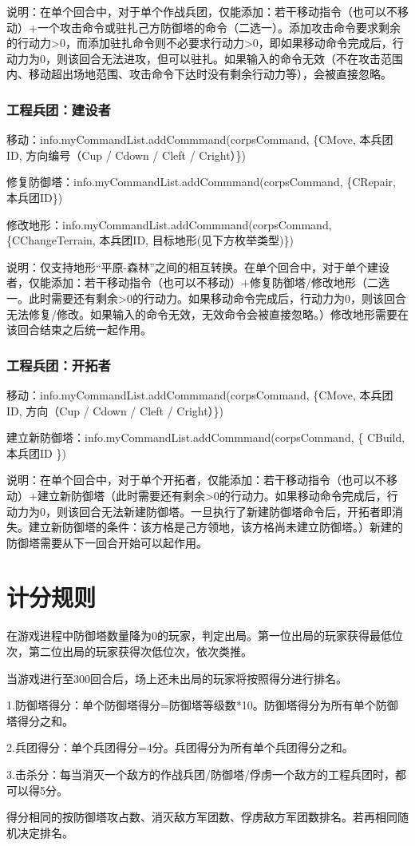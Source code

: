 \documentclass[a4paper,4pt]{article}
\begin{document}
说明：在单个回合中，对于单个作战兵团，仅能添加：若干移动指令（也可以不移动）+一个攻击命令或驻扎己方防御塔的命令（二选一）。添加攻击命令要求剩余的行动力>0，而添加驻扎命令则不必要求行动力>0，即如果移动命令完成后，行动力为0，则该回合无法进攻，但可以驻扎。如果输入的命令无效（不在攻击范围内、移动超出场地范围、攻击命令下达时没有剩余行动力等），会被直接忽略。

\subsubsection{工程兵团：建设者}
移动：info.myCommandList.addCommmand(corpsCommand, \{CMove, 本兵团ID, 方向编号（Cup / Cdown / Cleft / Cright）\})\par
修复防御塔：info.myCommandList.addCommmand(corpsCommand, \{CRepair, 本兵团ID\})\par
修改地形：info.myCommandList.addCommmand(corpsCommand, \{CChangeTerrain, 本兵团ID, 目标地形(见下方枚举类型)\})\par
说明：仅支持地形“平原-森林”之间的相互转换。在单个回合中，对于单个建设者，仅能添加：若干移动指令（也可以不移动）+修复防御塔/修改地形（二选一。此时需要还有剩余>0的行动力。如果移动命令完成后，行动力为0，则该回合无法修复/修改。如果输入的命令无效，无效命令会被直接忽略。）修改地形需要在该回合结束之后统一起作用。
\subsubsection{工程兵团：开拓者}
移动：info.myCommandList.addCommmand(corpsCommand, \{CMove, 本兵团ID, 方向（Cup / Cdown / Cleft / Cright）\})\par
建立新防御塔：info.myCommandList.addCommmand(corpsCommand, \{ CBuild, 本兵团ID \})\par
说明：在单个回合中，对于单个开拓者，仅能添加：若干移动指令（也可以不移动）+建立新防御塔（此时需要还有剩余>0的行动力。如果移动命令完成后，行动力为0，则该回合无法新建防御塔。一旦执行了新建防御塔命令后，开拓者即消失。建立新防御塔的条件：该方格是己方领地，该方格尚未建立防御塔。）新建的防御塔需要从下一回合开始可以起作用。

\section{计分规则}
在游戏进程中防御塔数量降为0的玩家，判定出局。第一位出局的玩家获得最低位次，第二位出局的玩家获得次低位次，依次类推。\par
当游戏进行至300回合后，场上还未出局的玩家将按照得分进行排名。\par
1.防御塔得分：单个防御塔得分=防御塔等级数*10。防御塔得分为所有单个防御塔得分之和。\par
2.兵团得分：单个兵团得分=4分。兵团得分为所有单个兵团得分之和。\par
3.击杀分：每当消灭一个敌方的作战兵团/防御塔/俘虏一个敌方的工程兵团时，都可以得5分。\par
得分相同的按防御塔攻占数、消灭敌方军团数、俘虏敌方军团数排名。若再相同随机决定排名。\par
\end{document}
